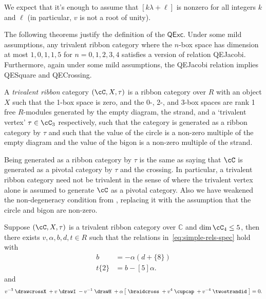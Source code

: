 \documentclass[12pt]{amsart}
\begin{document}
We expect that it's enough to assume that $[k \lambda + \ell]$ is nonzero for all integers $k$ and $\ell$ (in particular, $v$ is not a root of unity).

The following theorems justify the definition of the $\mathsf{QExc}$.  Under
some mild assumptions, any trivalent ribbon category where the $n$-box space
has dimension at most $1,0,1,1,5$ for $n=0,1,2,3,4$ satisfies a version of
relation QEJacobi.  Furthermore, again under some mild assumptions, the
QEJacobi relation implies QESquare and QECrossing.


\begin{definition}
\label{def:TrivalentRibbon}
A \emph{trivalent ribbon} category $(\cC, X, \tau)$ is a ribbon category over
$R$ with  an object $X$ such that
the 1-box space is zero, and the 0-, 2-, and 3-box spaces are rank 1 free $R$-modules
generated by the empty diagram, the strand, and a `trivalent vertex' $\tau \in \cC_3$ 
respectively, such that the category is
generated as a ribbon category by $\tau$ and such that the value of the circle
is a non-zero multiple of the empty diagram and the value of the bigon is a
non-zero multiple of the strand.
\end{definition}

Being generated as a ribbon category by $\tau$ is the same as saying that
$\cC$ is generated as a pivotal category by $\tau$ and the crossing.  In
particular, a trivalent ribbon category need not be trivalent in the sense of
\cite{MR3624901} where the trivalent vertex alone is assumed to generate $\cC$ 
as a pivotal category.  Also we have weakened the non-degeneracy condition from
\cite{MR3624901}, replacing it with the assumption that the circle and bigon
are non-zero.

\begin{theorem} \label{thm:Jacobi}
Suppose $(\cC, X, \tau)$ is a trivalent ribbon category over
$\mathbb{C}$ and $\dim{\cC_4} \leq 5$, then there exists $v, \alpha,
b, d, t \in R$ such that the relations in~\eqref{eq:simple-rels-spec}
hold with
\begin{align*}
  [5] b &= - \alpha (d+\{8\}) \\
  t \{2\} &= b-[5] \alpha.
\end{align*}
and
\begin{equation}
v^{-3} \;
\drawcrossX
\;+ v \;
\drawI
\; -v^{-1} \;
 \drawH
\;
 + \alpha
\left[\; \braidcross \;
 + v^{4}\;
\cupcap
\; + v^{-4} \;
 \twostrandid \;
 \right] = 0.\label{eq:quant-except-gen}
\end{equation}
\end{theorem}
\end{document}
